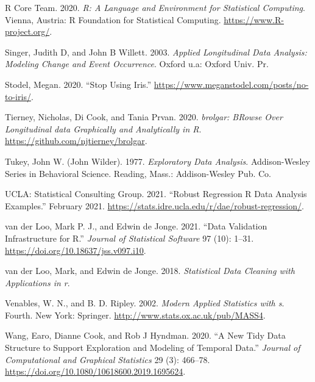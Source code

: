 \documentclass{article}
\newlength{\cslhangindent}
\newlength{\cslentryspacingunit} %
\newenvironment{CSLReferences}[2] %
 {%
  \setlength{\parindent}{0pt}
  \ifodd #1
  \let\oldpar\par
  \def\par{\hangindent=\cslhangindent\oldpar}
  \fi
  \setlength{\parskip}{#2\cslentryspacingunit}
 }%
 {}
\begin{document}
\begin{CSLReferences}{1}{0}
\leavevmode{}%
R Core Team. 2020. \emph{R: A Language and Environment for Statistical Computing}. Vienna, Austria: R Foundation for Statistical Computing. \url{https://www.R-project.org/}.

\leavevmode{}%
Singer, Judith D, and John B Willett. 2003. \emph{Applied Longitudinal Data Analysis: Modeling Change and Event Occurrence}. Oxford u.a: Oxford Univ. Pr.

\leavevmode{}%
Stodel, Megan. 2020. {``Stop Using Iris.''} \url{https://www.meganstodel.com/posts/no-to-iris/}.

\leavevmode{}%
Tierney, Nicholas, Di Cook, and Tania Prvan. 2020. \emph{{brolgar: BRowse Over Longitudinal data Graphically and Analytically in R}}. \url{https://github.com/njtierney/brolgar}.

\leavevmode{}%
Tukey, John W. (John Wilder). 1977. \emph{Exploratory Data Analysis}. Addison-Wesley Series in Behavioral Science. Reading, Mass.: Addison-Wesley Pub. Co.

\leavevmode{}%
UCLA: Statistical Consulting Group. 2021. {``{Robust Regression \textbar{} R Data Analysis Examples}.''} February 2021. \url{https://stats.idre.ucla.edu/r/dae/robust-regression/}.

\leavevmode{}%
van der Loo, Mark P. J., and Edwin de Jonge. 2021. {``Data Validation Infrastructure for {R}.''} \emph{Journal of Statistical Software} 97 (10): 1--31. \url{https://doi.org/10.18637/jss.v097.i10}.

\leavevmode{}%
van der Loo, Mark, and Edwin de Jonge. 2018. \emph{Statistical Data Cleaning with Applications in r}.

\leavevmode{}%
Venables, W. N., and B. D. Ripley. 2002. \emph{Modern Applied Statistics with s}. Fourth. New York: Springer. \url{http://www.stats.ox.ac.uk/pub/MASS4}.

\leavevmode{}%
Wang, Earo, Dianne Cook, and Rob J Hyndman. 2020. {``A New Tidy Data Structure to Support Exploration and Modeling of Temporal Data.''} \emph{Journal of Computational and Graphical Statistics} 29 (3): 466--78. \url{https://doi.org/10.1080/10618600.2019.1695624}.


\end{CSLReferences}
\end{document}
